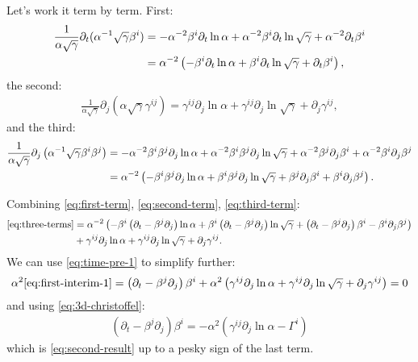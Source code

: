\documentclass[aps,prd,preprint]{revtex4-1}
\begin{document}
Let's work it term by term. First:
\begin{align}
  \frac{1}{\alpha \sqrt{\gamma}} \partial_t (
    \alpha^{-1} \sqrt{\gamma} \beta^i ) & =
    - \alpha^{-2} \beta^i \partial_t \ln \alpha
    + \alpha^{-2} \beta^i \partial_t \ln \sqrt{\gamma}
    + \alpha^{-2} \partial_t \beta^i \notag \\
  & =
    \alpha^{-2} \left(
      - \beta^i \partial_t \ln \alpha
      + \beta^i \partial_t \ln \sqrt{\gamma}
      + \partial_t \beta^i \right) \label{eq:first-term},
\end{align}
the second:
\begin{align}
  \frac{1}{\alpha \sqrt{\gamma}} \partial_j \left(
    \alpha \sqrt{\gamma} \gamma^{ij} \right) =
    \gamma^{ij} \partial_j \ln \alpha
    + \gamma^{ij} \partial_j \ln \sqrt{\gamma}
    + \partial_j \gamma^{ij} \label{eq:second-term},
\end{align}
and the third:
\begin{align}
  \frac{1}{\alpha \sqrt{\gamma}} \partial_j \left(
    \alpha^{-1} \sqrt{\gamma} \beta^i \beta^j \right) & =
    - \alpha^{-2} \beta^i \beta^j \partial_j \ln \alpha
    + \alpha^{-2} \beta^i \beta^j \partial_j \ln \sqrt{\gamma}
    + \alpha^{-2} \beta^j \partial_j \beta^i
    + \alpha^{-2} \beta^i \partial_j \beta^j \notag \\
  & =
    \alpha^{-2} \left(
      - \beta^i \beta^j \partial_j \ln \alpha
      + \beta^i \beta^j \partial_j \ln \sqrt{\gamma}
      + \beta^j \partial_j \beta^i
      + \beta^i \partial_j \beta^j \right) \label{eq:third-term}.
\end{align}

Combining \eqref{eq:first-term}, \eqref{eq:second-term},
\eqref{eq:third-term}:
\begin{align}
  \eqref{eq:three-terms} & = \alpha^{-2} \left(
    - \beta^i \left( \partial_t - \beta^j \partial_j \right) \ln \alpha
    + \beta^i \left(\partial_t - \beta^j \partial_j \right)
      \ln \sqrt{\gamma}
      + \left( \partial_t - \beta^j \partial_j \right) \beta^i
    - \beta^i \partial_j \beta^j \right) \notag \\
  & +
    \gamma^{ij} \partial_j \ln \alpha
    + \gamma^{ij} \partial_j \ln \sqrt{\gamma}
    + \partial_j \gamma^{ij} \label{eq:first-interim-1}.
\end{align}
We can use \eqref{eq:time-pre-1} to simplify further:
\begin{align}
  \alpha^2 \eqref{eq:first-interim-1} =
    \left( \partial_t - \beta^j \partial_j \right) \beta^i
    + \alpha^2 \left( \gamma^{ij} \partial_j \ln \alpha
      + \gamma^{ij} \partial_j \ln \sqrt{\gamma}
      + \partial_j \gamma^{ij} \right) = 0
\end{align}
and using \eqref{eq:3d-christoffel}:
\begin{align}
  \left( \partial_t - \beta^j \partial_j \right) \beta^i =
  - \alpha^2 \left(
    \gamma^{ij} \partial_j \ln \alpha
  - \Gamma^i \right)
\end{align}
which is \eqref{eq:second-result} up to a pesky sign of the last term.
\end{document}
